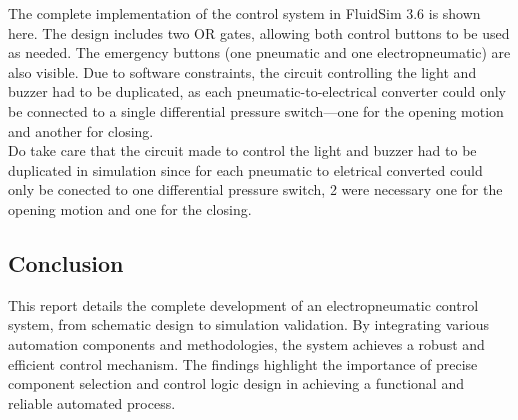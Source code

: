 The complete implementation of the control system in FluidSim 3.6 is shown here. The design includes two OR gates, 
allowing both control buttons to be used as needed. The emergency buttons (one pneumatic and one electropneumatic) 
are also visible. Due to software constraints, the circuit controlling the light and buzzer had to be duplicated, as 
each pneumatic-to-electrical converter could only be connected to a single differential pressure switch—one for the 
opening motion and another for closing.\\

Do take care that the circuit made to control the light and buzzer had to be duplicated in simulation 
since for each pneumatic to eletrical converted could only be conected to one differential pressure switch, 2 were necessary
one for the opening motion and one for the closing.

\subsection{Conclusion}

This report details the complete development of an electropneumatic control system, from schematic 
design to simulation validation. By integrating various automation components and methodologies, 
the system achieves a robust and efficient control mechanism. The findings highlight the importance 
of precise component selection and control logic design in achieving a functional and reliable 
automated process.